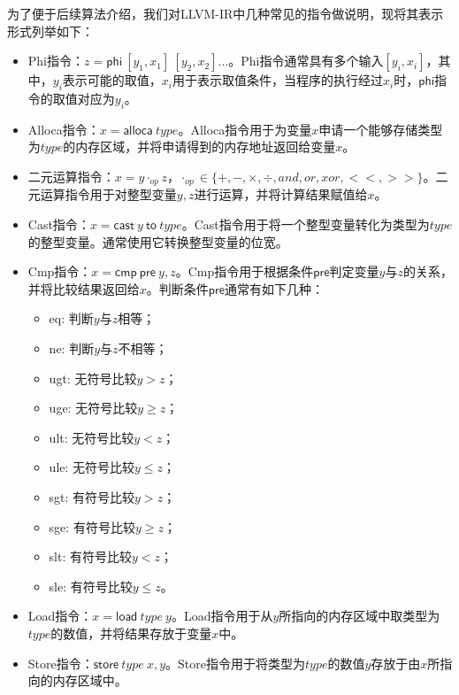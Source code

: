 为了便于后续算法介绍，我们对LLVM-IR中几种常见的指令做说明，现将其表示形式列举如下：
\begin{itemize}	
	\item Phi指令：$ z = \mathsf{phi}~[y_1, x_1]~ [y_2, x_2] \dots $。Phi指令通常具有多个输入$ [y_i, x_i] $，其中，$ y_i $表示可能的取值，$ x_i $用于表示取值条件，当程序的执行经过$ x_i $时，$ \mathsf{phi} $指令的取值对应为$ y_i $。
	
	\item Alloca指令：$ x = \mathsf{alloca}~type $。Alloca指令用于为变量$ x $申请一个能够存储类型为$ type $的内存区域，并将申请得到的内存地址返回给变量$ x $。
	
	\item 二元运算指令：$ x = y \cdot_{op} z $，$ \cdot_{op} \in \{+, -, \times, \div, and, or, xor, <<, >>\} $。二元运算指令用于对整型变量$ y, z $进行运算，并将计算结果赋值给$ x $。
	
	\item Cast指令：$ x = \mathsf{cast}~ y~ \mathsf{to}~type $。Cast指令用于将一个整型变量转化为类型为$ type $的整型变量。通常使用它转换整型变量的位宽。
	
	
	\item Cmp指令：$ x = \mathsf{cmp~pre}  ~y, z$。Cmp指令用于根据条件$ \mathsf{pre} $判定变量$ y $与$ z $的关系，并将比较结果返回给$ x $。判断条件$ \mathsf{pre} $通常有如下几种：
		\begin{itemize}
			\item eq: 判断$ y $与$ z $相等；
			\item ne: 判断$ y $与$ z $不相等；
			\item ugt: 无符号比较$ y > z $；
			\item uge: 无符号比较$ y \ge z $；
			\item ult: 无符号比较$ y < z $；
			\item ule: 无符号比较$ y \le z $；
			\item sgt: 有符号比较$ y > z $；
			\item sge: 有符号比较$ y \ge z $；
			\item slt: 有符号比较$ y < z $；
			\item sle: 有符号比较$ y \le z $。
		\end{itemize}
	
	\item Load指令：$ x = \mathsf{load} ~type ~y $。Load指令用于从$ y $所指向的内存区域中取类型为$ type $的数值，并将结果存放于变量$ x $中。
	
	\item Store指令：$ \mathsf{store}  ~type ~x, y $。Store指令用于将类型为$ type $的数值$ y $存放于由$ x $所指向的内存区域中。
\end{itemize}

